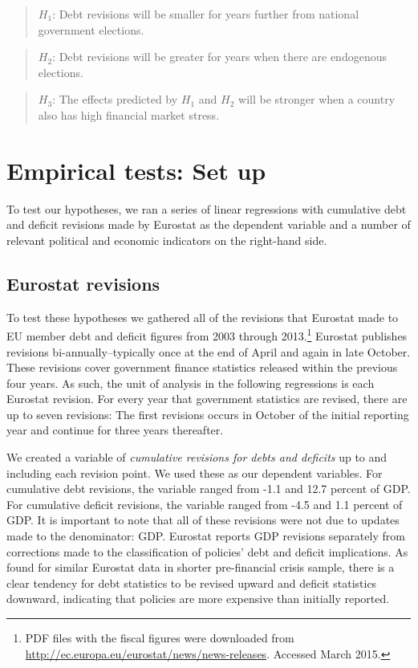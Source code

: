 \documentclass[]{article}
\begin{document}
\begin{quote}
    $H_{1}$: Debt revisions will be smaller for years further from national government elections.
\end{quote}

\begin{quote}
    $H_{2}$: Debt revisions will be greater for years when there are endogenous elections.
\end{quote}

\begin{quote}
    $H_{3}$: The effects predicted by $H_{1}$ and $H_{2}$ will be stronger when a country also has high financial market stress.
\end{quote}

\section{Empirical tests: Set up}

To test our hypotheses, we ran a series of linear regressions with cumulative debt and deficit revisions made by Eurostat as the dependent variable and a number of relevant political and economic indicators on the right-hand side.

\subsection{Eurostat revisions}

To test these hypotheses we gathered all of the revisions that Eurostat made to EU member debt and deficit figures from 2003 through 2013.\footnote{PDF files with the fiscal figures were downloaded from \url{http://ec.europa.eu/eurostat/news/news-releases}. Accessed March 2015.} Eurostat publishes revisions bi-annually--typically once at the end of April and again in late October. These revisions cover government finance statistics released within the previous four years. As such, the unit of analysis in the following regressions is each Eurostat revision. For every year that government statistics are revised, there are up to seven revisions: The first revisions occurs in October of the initial reporting year and continue for three years thereafter.

We created a variable of \emph{cumulative revisions for debts and deficits} up to and including each revision point. We used these as our dependent variables. For cumulative debt revisions, the variable ranged from -1.1 and 12.7 percent of GDP. For cumulative deficit revisions, the variable ranged from -4.5 and 1.1 percent of GDP. It is important to note that all of these revisions were not due to updates made to the denominator: GDP. Eurostat reports GDP revisions separately from corrections made to the classification of policies' debt and deficit implications. As \cite{DeCastro2013} found for similar Eurostat data in shorter pre-financial crisis sample, there is a clear tendency for debt statistics to be revised upward and deficit statistics downward, indicating that policies are more expensive than initially reported.
\end{document}

